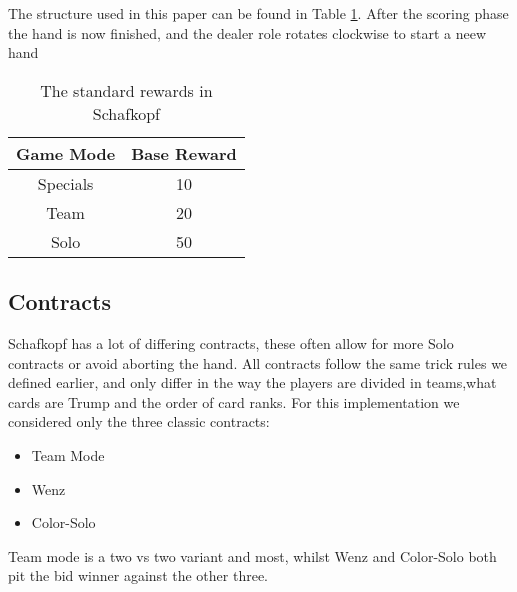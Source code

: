 The structure used in this paper can be found in Table \ref{tab:rewardsStrucutre}.
After the scoring phase the hand is now finished, and the dealer role rotates clockwise to start a neew hand
\begin{table}[h!]
    \centering
    \begin{tabular}{cc}
        \toprule
        Game Mode & Base Reward \\
        \midrule
        Specials  & 10          \\
        Team      & 20          \\
        Solo      & 50          \\
        \bottomrule
    \end{tabular}
    \caption{The standard rewards in Schafkopf}
    \label{tab:rewardsStrucutre}
\end{table}

\subsection{Contracts}
Schafkopf has a lot of differing contracts, these often allow for more Solo contracts or avoid aborting the hand.
All contracts follow the same trick rules we defined earlier, and only differ in the way the players are divided in
teams,what cards are Trump and the order of card ranks.
For this implementation we considered only the three classic contracts:
\begin{itemize}
    \item Team Mode
    \item Wenz
    \item Color-Solo
\end{itemize}
Team mode is a two vs two variant and most, whilst Wenz and Color-Solo both pit the bid winner against the other three.

